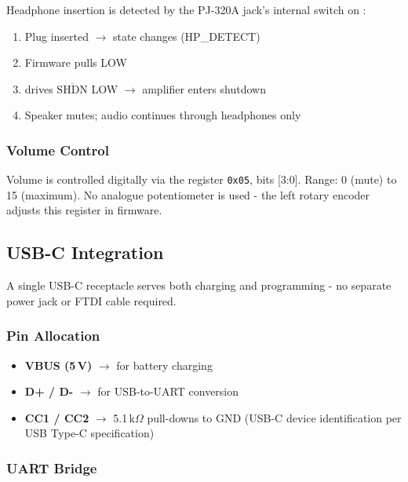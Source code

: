 Headphone insertion is detected by the PJ-320A jack's internal switch on
:
%
\begin{enumerate}[leftmargin=2em, itemsep=2pt]
  \item Plug inserted $\to$  state changes (HP\_DETECT)
  \item Firmware pulls  LOW
  \item {} drives  $\overline{\text{SHDN}}$ LOW $\to$ amplifier
        enters shutdown
  \item Speaker mutes; audio continues through headphones only
\end{enumerate}

\subsubsection{Volume Control}

Volume is controlled digitally via the  register \texttt{0x05},
bits [3:0].  Range: 0 (mute) to 15 (maximum).  No analogue potentiometer is
used - the left rotary encoder adjusts this register in firmware.

\subsection{USB-C Integration}

A single USB-C receptacle serves both charging and programming - no separate
power jack or FTDI cable required.

\subsubsection{Pin Allocation}

\begin{itemize}[leftmargin=1.8em, itemsep=2pt]
  \item \textbf{VBUS (5\,V)} $\to$   for battery charging
  \item \textbf{D+ / D-} $\to$  for USB-to-UART conversion
  \item \textbf{CC1 / CC2} $\to$ 5.1\,k$\Omega$ pull-downs to GND (USB-C device
        identification per USB Type-C specification)
\end{itemize}

\subsubsection{UART Bridge}

